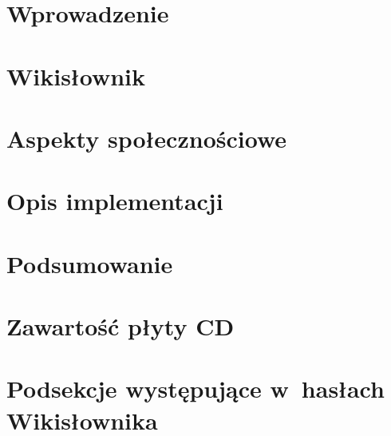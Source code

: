 

\chapter{Wprowadzenie}


\chapter{Wikisłownik}


\chapter{Aspekty społecznościowe}


\chapter{Opis implementacji}


\chapter{Podsumowanie}


\appendix
\chapter{Zawartość płyty CD}


\chapter{Podsekcje występujące w~hasłach Wikisłownika}



